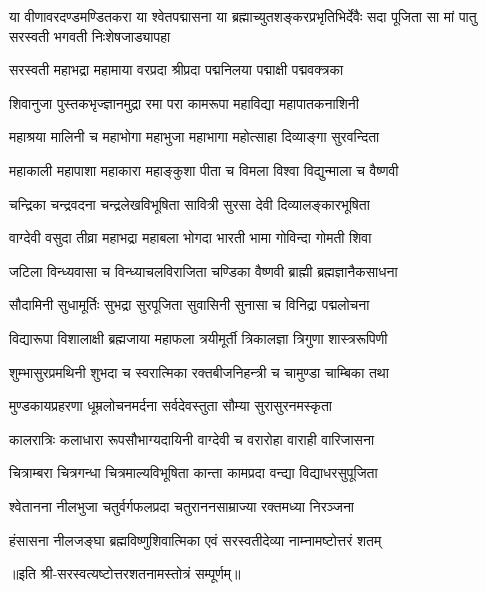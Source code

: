 

{या वीणावरदण्डमण्डितकरा या श्वेतपद्मासना}
{या ब्रह्माच्युतशङ्करप्रभृतिभिर्देवैः सदा पूजिता}
{सा मां पातु सरस्वती भगवती निःशेषजाड्यापहा}

\twolineshloka
{सरस्वती महाभद्रा महामाया वरप्रदा}
{श्रीप्रदा पद्मनिलया पद्माक्षी पद्मवक्त्रका}

\twolineshloka
{शिवानुजा पुस्तकभृज्ज्ञानमुद्रा रमा परा}
{कामरूपा महाविद्या महापातकनाशिनी}

\twolineshloka
{महाश्रया मालिनी च महाभोगा महाभुजा}
{महाभागा महोत्साहा दिव्याङ्गा सुरवन्दिता}

\twolineshloka
{महाकाली महापाशा महाकारा महाङ्कुशा}
{पीता च विमला विश्वा विद्युन्माला च वैष्णवी}

\twolineshloka
{चन्द्रिका चन्द्रवदना चन्द्रलेखविभूषिता}
{सावित्री सुरसा देवी दिव्यालङ्कारभूषिता}

\twolineshloka
{वाग्देवी वसुदा तीव्रा महाभद्रा महाबला}
{भोगदा भारती भामा गोविन्दा गोमती शिवा}

\twolineshloka
{जटिला विन्ध्यवासा च विन्ध्याचलविराजिता}
{चण्डिका वैष्णवी ब्राह्मी ब्रह्मज्ञानैकसाधना}

\twolineshloka
{सौदामिनी सुधामूर्तिः सुभद्रा सुरपूजिता}
{सुवासिनी सुनासा च विनिद्रा पद्मलोचना}

\twolineshloka
{विद्यारूपा विशालाक्षी ब्रह्मजाया महाफला}
{त्रयीमूर्ती त्रिकालज्ञा त्रिगुणा शास्त्ररूपिणी}

\twolineshloka
{शुम्भासुरप्रमथिनी शुभदा च स्वरात्मिका}
{रक्तबीजनिहन्त्री च चामुण्डा चाम्बिका तथा}

\twolineshloka
{मुण्डकायप्रहरणा धूम्रलोचनमर्दना}
{सर्वदेवस्तुता सौम्या सुरासुरनमस्कृता}

\twolineshloka
{कालरात्रिः कलाधारा रूपसौभाग्यदायिनी}
{वाग्देवी च वरारोहा वाराही वारिजासना}

\twolineshloka
{चित्राम्बरा चित्रगन्धा चित्रमाल्यविभूषिता}
{कान्ता कामप्रदा वन्द्या विद्याधरसुपूजिता}

\twolineshloka
{श्वेतानना नीलभुजा चतुर्वर्गफलप्रदा}
{चतुराननसाम्राज्या रक्तमध्या निरञ्जना}

\twolineshloka
{हंसासना नीलजङ्घा ब्रह्मविष्णुशिवात्मिका}
{एवं सरस्वतीदेव्या नाम्नामष्टोत्तरं शतम्}

॥इति श्री-सरस्वत्यष्टोत्तरशतनामस्तोत्रं सम्पूर्णम्॥